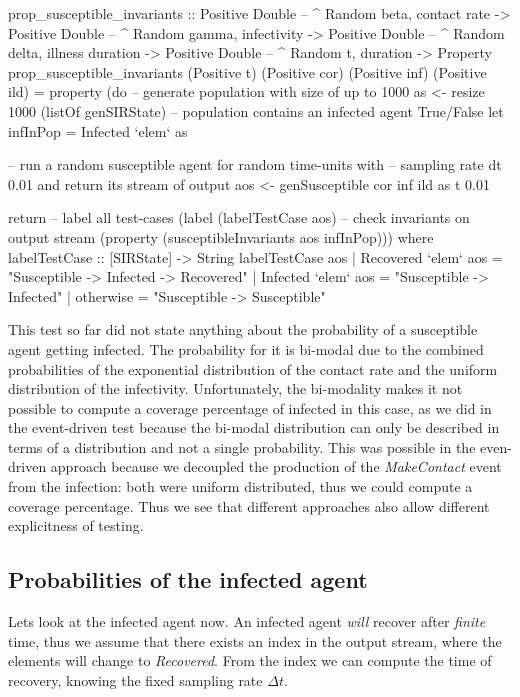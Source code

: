 \begin{HaskellCode}
prop_susceptible_invariants :: Positive Double  -- ^ Random beta, contact rate
                            -> Positive Double  -- ^ Random gamma, infectivity
                            -> Positive Double  -- ^ Random delta, illness duration
                            -> Positive Double  -- ^ Random t, duration 
                            -> Property
prop_susceptible_invariants 
      (Positive t) (Positive cor) (Positive inf) (Positive ild) = property (do  
    -- generate population with size of up to 1000
    as <- resize 1000 (listOf genSIRState)
    -- population contains an infected agent True/False
    let infInPop = Infected `elem` as

    -- run a random susceptible agent for random time-units with 
    -- sampling rate dt 0.01 and return its stream of output
    aos <- genSusceptible cor inf ild as t 0.01

    return 
        -- label all test-cases
        (label (labelTestCase aos) 
        -- check invariants on output stream
        (property (susceptibleInvariants aos infInPop)))
  where
    labelTestCase :: [SIRState] -> String
    labelTestCase aos
      | Recovered `elem` aos = "Susceptible -> Infected -> Recovered"
      | Infected `elem` aos  = "Susceptible -> Infected"
      | otherwise            = "Susceptible -> Susceptible"
\end{HaskellCode}

This test so far did not state anything about the probability of a susceptible agent getting infected. The probability for it is bi-modal due to the combined probabilities of the exponential distribution of the contact rate and the uniform distribution of the infectivity. Unfortunately, the bi-modality makes it not possible to compute a coverage percentage of infected in this case, as we did in the event-driven test because the bi-modal distribution can only be described in terms of a distribution and not a single probability. This was possible in the even-driven approach because we decoupled the production of the \textit{MakeContact} event from the infection: both were uniform distributed, thus we could compute a coverage percentage. Thus we see that different approaches also allow different explicitness of testing.

\subsection{Probabilities of the infected agent}
Lets look at the infected agent now. An infected agent \textit{will} recover after \textit{finite} time, thus we assume that there exists an index in the output stream, where the elements will change to \textit{Recovered}. From the index we can compute the time of recovery, knowing the fixed sampling rate $\Delta t$.

